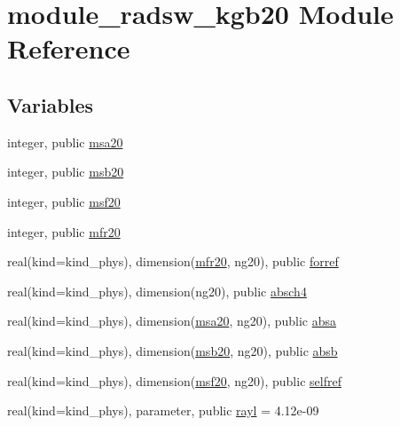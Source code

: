 \hypertarget{namespacemodule__radsw__kgb20}{}\section{module\+\_\+radsw\+\_\+kgb20 Module Reference}
\label{namespacemodule__radsw__kgb20}
\subsection*{Variables}
\begin{DoxyCompactItemize}
\item 
integer, public \hyperlink{namespacemodule__radsw__kgb20_aadf199a3d453192a891b575d9adf8608}{msa20}
\item 
integer, public \hyperlink{group__module__radsw__main_ga385f5b8c61ed1de7aa3bbb6bd65f522f}{msb20}
\item 
integer, public \hyperlink{group__module__radsw__main_ga925dc2da02eef4edcf000a14525a7c7e}{msf20}
\item 
integer, public \hyperlink{group__module__radsw__main_ga9c7964eeb3acb4a11757fce977b73022}{mfr20}
\item 
real(kind=kind\+\_\+phys), dimension(\hyperlink{group__module__radsw__main_ga9c7964eeb3acb4a11757fce977b73022}{mfr20}, ng20), public \hyperlink{group__module__radsw__main_ga3a660a7564064ca9997af9f95a5293b9}{forref}
\item 
real(kind=kind\+\_\+phys), dimension(ng20), public \hyperlink{group__module__radsw__main_ga1757aee0ec8211f84e2c9334cc9b0f9d}{absch4}
\item 
real(kind=kind\+\_\+phys), dimension(\hyperlink{namespacemodule__radsw__kgb20_aadf199a3d453192a891b575d9adf8608}{msa20}, ng20), public \hyperlink{group__module__radsw__main_ga405eabf194b1216dd083c2344e80f5b4}{absa}
\item 
real(kind=kind\+\_\+phys), dimension(\hyperlink{group__module__radsw__main_ga385f5b8c61ed1de7aa3bbb6bd65f522f}{msb20}, ng20), public \hyperlink{group__module__radsw__main_gaf5b135f82f34831e86a12f726cbe47ad}{absb}
\item 
real(kind=kind\+\_\+phys), dimension(\hyperlink{group__module__radsw__main_ga925dc2da02eef4edcf000a14525a7c7e}{msf20}, ng20), public \hyperlink{group__module__radsw__main_gaa3853af5e29277f9ed2bdd397cab5029}{selfref}
\item 
real(kind=kind\+\_\+phys), parameter, public \hyperlink{group__module__radsw__main_ga6a00db6ce81c299d44ef5eadc1fe3b5b}{rayl} = 4.\+12e-\/09
\end{DoxyCompactItemize}


